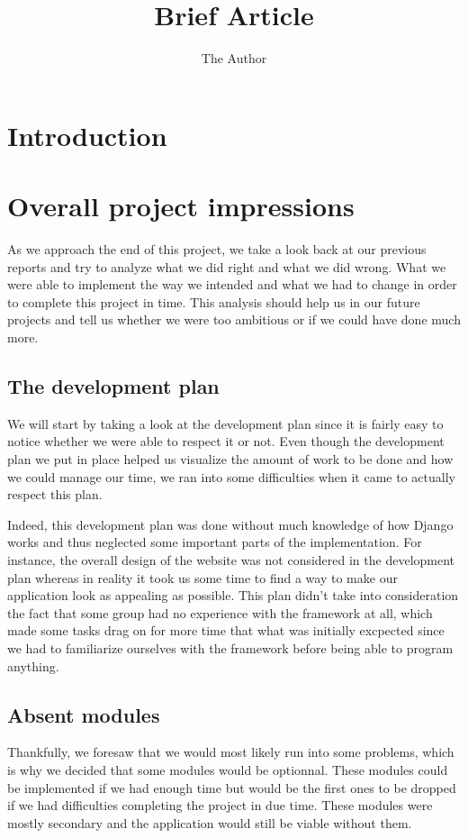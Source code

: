\documentclass[11pt, a4paper]{article}   	%
\title{Brief Article}
\author{The Author}
\begin{document}

\section{Introduction}

\section{Overall project impressions}

As we approach the end of this project, we take a look back at our previous reports and try to analyze what we did right and what we did wrong. What we were able to implement the way we intended and what we had to change in order to complete this project in time. This analysis should help us in our future projects and tell us whether we were too ambitious or if we could have done much more.

\subsection{The development plan}

We will start by taking a look at the development plan since it is fairly easy to notice whether we were able to respect it or not. Even though the development plan we put in place helped us visualize the amount of work to be done and how we could manage our time, we ran into some difficulties when it came to actually respect this plan.

Indeed, this development plan was done without much knowledge of how Django works and thus neglected some important parts of the implementation. For instance, the overall design of the website was not considered in the development plan whereas in reality it took us some time to find a way to make our application look as appealing as possible. 
This plan didn't take into consideration the fact that some group had no experience with the framework at all, which made some tasks drag on for more time that what was initially excpected since we had to familiarize ourselves with the framework before being able to program anything. 

\subsection{Absent modules}
Thankfully, we foresaw that we would most likely run into some problems, which is why we decided that some modules would be optionnal. These modules could be implemented if we had enough time but would be the first ones to be dropped if we had difficulties completing the project in due time. These modules were mostly secondary and the application would still be viable without them.
\end{document}
